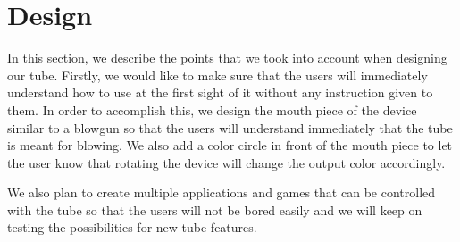 \section{Design}\label{sec:design}

In this section, we describe the points that we took into account when designing our tube. Firstly, we would like to make sure that the users will immediately understand how to use \tube at the first sight of it without any instruction given to them. In order to accomplish this, we design the mouth piece of the device similar to a blowgun so that the users will understand immediately that the tube is meant for blowing. We also add a color circle in front of the mouth piece to let the user know that rotating the device will change the output color accordingly.

We also plan to create multiple applications and games that can be controlled with the tube so that the users will not be bored easily and we will keep on testing the possibilities for new tube features.
